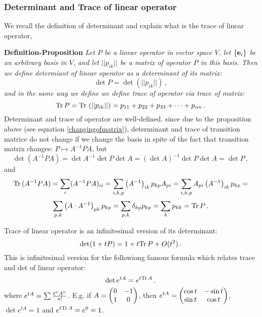 \documentclass[12pt]{article}
\numberwithin{equation}{section}
\begin{document}
\subsubsection{Determinant and Trace of linear operator}
We recall the definition of determinant and explain what is the trace
of linear operator,

   {\bf Definition-Proposition}
{\it Let $P$ be a linear operator in vector space $V$, 
let $\{{\bf e}_i\}$ be an arbitrary basis in $V$, and let
$||p_{ik}||$ be a matrix of operator $P$
in this basis. Then we define determiant of linear operator
as a determinant of its matrix:
           $$
  \det P= \det \left(||p_{ik}||\right)\,,
            $$
and in the same way we define 
we define trace of operator via trace of matrix:}
            \begin{equation}\label{traceofoperator}
      {\rm Tr\,}P={\rm Tr\,}\left(||p_{ik}||\right)=
    p_{11}+p_{22}+p_{33}+\dots+p_{nn}\,.
             \end{equation}
Determinant and trace of operator are well-defined. since
due to the proposition above (see equation \eqref{changingofmatrix}),
determinant and trace of transition matrice do not change
if we change the basis in spite of the  fact that 
transition matrix changes:
$P\mapsto A^{-1}PA$, but
              $$
              \det \left(A^{-1}PA\right)=
              \det A^{-1}\det P\det A=
(\det A)^{-1}\det P \det A=\det P\,,
              $$
and           $$
   {\rm Tr\,}(A^{-1}PA)=\sum_i(A^{-1}PA)_{ii}=
\sum_{i,k,p}\left(A^{-1}\right)_{ik}p_{kp}A_{pi}=
\sum_{i,k,p}A_{pi}\left(A^{-1}\right)_{ik}p_{kp}=
          $$
          $$
\sum_{p,k}\left(A\cdot A^{-1}\right)_{pk}p_{kp}=
\sum_{p,k}\delta_{kp}p_{kp}=\sum_k p_{kk}={\rm Tr\,}P\,.
              $$

{\footnotesize Trace of linear operator is an infinitesimal version of its determinant:
       $$
   \det(1+tP)=1+t{\rm Tr\,}P+O(t^2)\,.
       $$
This is infinitesimal version for the followiong
famous formula which relates trace and det of linear
operator:
        \begin{equation}\label{Liovilleformula}
         \det e^{tA}=e^{t{\rm Tr\,}A}\,.
         \end{equation}
where $e^{tA}=\sum{t^nA^n\over n!}$. E.g. if
$A=\begin{pmatrix}0 &-1\cr 1 &0\end{pmatrix}$,
then $e^{tA}=\begin{pmatrix} \cos t&-\sin t\cr \sin t &\cos t\end{pmatrix}$,
$\det e^{tA}=1$ and $e^{t{\rm Tr\,}A}=e^0=1$. }
\end{document}
